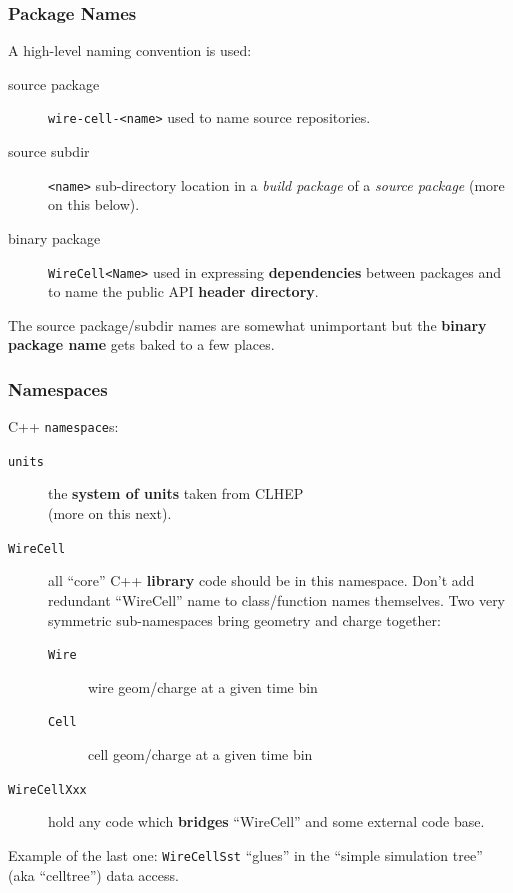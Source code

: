 \documentclass[xcolor=dvipsnames]{beamer}
\begin{document}
\begin{frame}
  \frametitle{Package Names}

  A high-level naming convention is used:

  \begin{description}
  \item[source package] \texttt{wire-cell-<name>} used to name source repositories.
  \item[source subdir] \texttt{<name>} sub-directory location in a \textit{build
    package} of a \textit{source package} (more on this below).
  \item[binary package] \texttt{WireCell<Name>} used in expressing
    \textbf{dependencies} between packages and to name the public API
    \textbf{header directory}.
  \end{description}

  The source package/subdir names are somewhat unimportant but the
  \textbf{binary package name} gets baked to a few places.
\end{frame}

\begin{frame}
  \frametitle{Namespaces}

  C++ \texttt{namespace}s:
  \begin{description}
  \item[\texttt{units}]  the \textbf{system of units} taken from CLHEP \\
    (more on this next).
  \item[\texttt{WireCell}] all ``core'' C++ \textbf{library} code
    should be in this namespace.
    Don't add redundant ``WireCell'' name to class/function names
    themselves.  Two very symmetric sub-namespaces bring geometry and charge together:
    \begin{description}
    \item[\texttt{Wire}] wire geom/charge at a given time bin
    \item[\texttt{Cell}] cell geom/charge at a given time bin
    \end{description}
  \item[\texttt{WireCellXxx}] hold any code which \textbf{bridges}
    ``WireCell'' and some external code base.
  \end{description}

  Example of the last one: \texttt{WireCellSst} ``glues'' in the
  ``simple simulation tree'' (aka ``celltree'') data access.

\end{frame}
\end{document}
